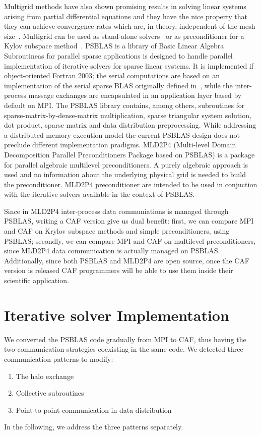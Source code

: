 \documentclass{IOS-Book-Article}
\begin{document}
Multigrid methods have also shown promising results in solving linear
systems arising from partial differential equations and they have the
nice property that they can achieve convergence rates which are, in
theory, independent of the mesh size~\cite{saad2003iterative}. 
Multigrid can be used as stand-alone solvers~\cite{brandt1977multi}
or as preconditioner for a Kylov subspace
method~\cite{bramble1990parallel}.  
PSBLAS is a library of Basic Linear Algebra Subroutineas for parallel
sparse applications is designed to handle parallel implementation of
iterative solvers for sparse linear systems. It is implemented if
object-oriented Fortran 2003; the serial computations are based on an
implementation of the serial sparse BLAS originally defined
in~\cite{duff2002overview}, while the inter-process 
massage exchanges are encapsulated in an application layer based by
default on MPI. The PSBLAS library contains, among 
others, 
subroutines for sparse-matrix-by-dense-matrix multiplication, sparse
triangular system solution, dot product, sparse matrix and data
distribution preprocessing. 
While addressing a distributed memory execution model the current
PSBLAS design does not preclude different implementation pradigms. 
MLD2P4 (Multi-level Domain Decomposition Parallel Preconditioners
Package based on PSBLAS) is a package for parallel algebraic
multilevel preconditioners. A purely algebraic approach is used and no
information about the underlying physical grid is needed to build the
preconditioner. MLD2P4 preconditioner are intended to be used in
conjuction with the iterative solvers available in the context of
PSBLAS.

Since in MLD2P4 inter-process data communiations is managed through
PSBLAS, writing a CAF version give us dual benefit: first, we can compare MPI and CAF on Krylov subspace methods and simple preconditioners, using PSBLAS; secondly, we can compare MPI and CAF on multilevel preconditioners, since MLD2P4 data communication is actually managed on PSBLAS. 
Additionally, since both PSBLAS and MLD2P4 are open source, once the
CAF version is released CAF programmers will be able to use them
inside their scientific application. 

 
\section{Iterative solver Implementation}
We converted the PSBLAS code gradually from MPI to CAF, thus having
the two communication strategies coexisting in the same code.  
We detected three communication patterns to modify:
\begin{enumerate}
\item The halo exchange
\item Collective subroutines
\item Point-to-point communication in data distribution
\end{enumerate}
In the following, we address the three patterns  separately.
\end{document}
